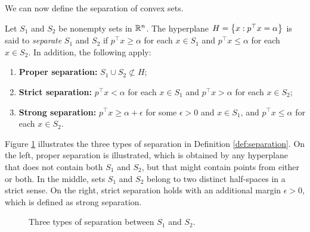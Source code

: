 We can now define the separation of convex sets. 
%
\begin{definition} \label{def:separation}
	Let $S_1$ and $S_2$ be nonempty sets in $\mathbb{R}^n$. The hyperplane $H = \left\{ x: p^\top x = \alpha \right \}$ is said to \emph{separate} $S_1$ and $S_2$ if $ p^\top x \geq \alpha$ for each $x \in S_1$ and $p^\top x \leq \alpha$ for each $x \in S_2$. In addition, the following apply: 
	\begin{enumerate}
		\item {\bf Proper separation:} $S_1 \cup S_2 \not\subset H$;
		\item {\bf Strict separation:} $ p^\top x < \alpha$ for each $x \in S_1$ and $p^\top x > \alpha$ for each $x \in S_2$;
		\item {\bf Strong separation:} $ p^\top x \geq \alpha + \epsilon$ for some $\epsilon >0$ and $x \in S_1$, and $p^\top x \leq \alpha$ for each $x \in S_2$.
	\end{enumerate}
\end{definition}
%
Figure \ref{fig:separation} illustrates the three types of separation in Definition \ref{def:separation}. On the left, proper separation is illustrated, which is obtained by any hyperplane that does not contain both $S_1$ and $S_2$, but that might contain points from either or both. In the middle, sets $S_1$ and $S_2$ belong to two distinct half-spaces in a strict sense. On the right, strict separation holds with an additional margin $\epsilon > 0$, which is defined as strong separation. 
%
\begin{figure}[H]
	\caption{Three types of separation between $S_1$ and $S_2$.} \label{fig:separation}
\end{figure}
